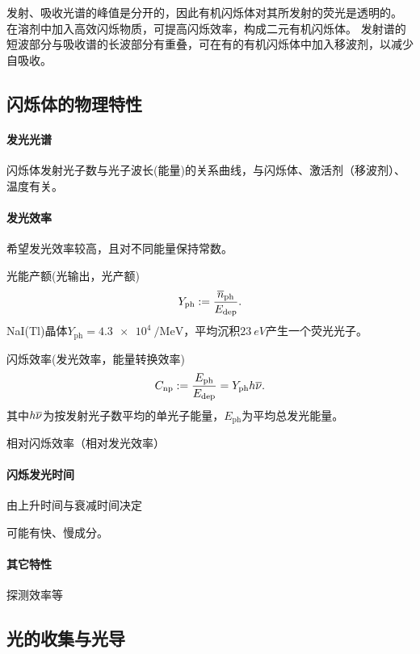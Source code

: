 发射、吸收光谱的峰值是分开的，因此有机闪烁体对其所发射的荧光是透明的。
在溶剂中加入高效闪烁物质，可提高闪烁效率，构成二元有机闪烁体。
发射谱的短波部分与吸收谱的长波部分有重叠，可在有的有机闪烁体中加入移波剂，以减少自吸收。

\subsection{闪烁体的物理特性}

\paragraph{发光光谱}
闪烁体发射光子数与光子波长(能量)的关系曲线，与闪烁体、激活剂（移波剂）、温度有关。
\paragraph{发光效率}
希望发光效率较高，且对不同能量保持常数。
\begin{compactenum}
	\item 光能产额(光输出，光产额)
	\begin{equation}\label{eq:nrd-scintillation-yield}
		Y_{\mathrm{ph}} := \frac{\overline{n}_{\mathrm{ph}}}{E_{\mathrm{dep}}}.
	\end{equation}
	NaI(Tl)晶体$Y_{\mathrm{ph}} = \qty{4.3e4}{\per\mega\electronvolt}$，平均沉积$\qty{23}{eV}$产生一个荧光光子。
	\item 闪烁效率(发光效率，能量转换效率)
	\begin{equation}\label{eq:nrd-scintillation-efficiency}
		C_{\mathrm{np}} := \frac{E_{\mathrm{ph}}}{E_{\mathrm{dep}}} = Y_{\mathrm{ph}}h\overline{\nu}.
	\end{equation}
	其中$h\overline{\nu}$为按发射光子数平均的单光子能量，$E_{\mathrm{ph}}$为平均总发光能量。
	\item 相对闪烁效率（相对发光效率）
\end{compactenum}
\paragraph{闪烁发光时间}
由上升时间与衰减时间决定

可能有快、慢成分。
\paragraph{其它特性}
探测效率等

\subsection{光的收集与光导}

